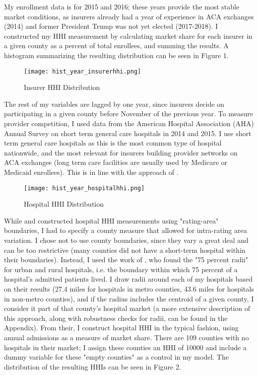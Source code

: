 \documentclass[12pt,letterpaper]{article}
\begin{document}
My enrollment data is for 2015 and 2016; these years provide the most stable market conditions, as insurers already had a year of experience in ACA exchanges (2014) and former President Trump was not yet elected (2017-2018). I constructed my HHI measurement by calculating market share for each insurer in a given county as a percent of total enrollees, and summing the results. A histogram summarizing the resulting distribution can be seen in Figure 1.

\begin{figure}[!h]
\begin{center}
\caption{Insurer HHI Distribution}\label{Figure 1}
\texttt{[image: hist\_year\_insurerhhi.png]}
\end{center}
\end{figure}

The rest of my variables are lagged by one year, since insurers decide on participating in a given county before November of the previous year. To measure provider competition, I used data from the American Hospital Association (AHA) Annual Survey on short term general care hospitals in 2014 and 2015. I use short term general care hospitals as this is the most common type of hospital nationwide, and the most relevant for insurers building provider networks on ACA exchanges (long term care facilities are usually used by Medicare or Medicaid enrollees). This is in line with the approach of \citet{scheffler_consolidation_2018}.  

\begin{figure}[!ht]
\begin{center}
\caption{Hospital HHI Distribution}\label{Figure 2}
\texttt{[image: hist\_year\_hospitalhhi.png]}
\end{center}
\end{figure}

While \citet{scheffler_consolidation_2018} and \citet{boozary_association_2019} constructed hospital HHI measurements using "rating-area" boundaries, I had to specify a county measure that allowed for intra-rating area variation. I chose not to use county boundaries, since they vary a great deal and can be too restrictive (many counties did not have a short-term hospital within their boundaries). Instead, I used the work of \citet{gresenz_updated_2004}, who found the "75 percent radii" for urban and rural hospitals, i.e. the boundary within which 75 percent of a hospital's admitted patients lived.  I draw radii around each of my hospitals based on their results (27.4 miles for hospitals in metro counties, 43.6 miles for hospitals in non-metro counties), and if the radius includes the centroid of a given county, I consider it part of that county's hospital market (a more extensive description of this approach, along with robustness checks for radii, can be found in the Appendix). From their, I construct hospital HHI in the typical fashion, using annual admissions as a measure of market share. There are 109 counties with no hospitals in their market; I assign these counties an HHI of 10000 and include a dummy variable for these "empty counties" as a control in my model. The distribution of the resulting HHIs can be seen in Figure 2. 
\end{document}
